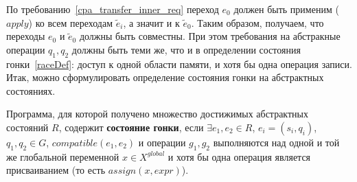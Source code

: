 По требованию~\ref{cpa_transfer_inner_req} переход $e_0$ должен быть применим ($apply$) ко всем переходам $\tilde{e}_i$, а значит и к $\tilde{e}_0$.
Таким образом, получаем, что переходы $e_0$ и $\tilde{e}_0$ должны быть совместны.
При этом требования на абстракные операции $q_1, q_2$ должны быть теми же, что и в определении состояния гонки~\ref{raceDef}: доступ к одной области памяти, и хотя бы одна операция записи.
Итак, можно сформулировать определение состояния гонки на абстрактных состояниях.

\begin{defn}
\label{raceDef_abstract}
Программа, для которой получено множество достижимых абстрактных состояний $R$, содержит \textbf{состояние гонки}, если $\exists e_1, e_2 \in R$, $e_i=(s_i,q_i)$, $q_1, q_2 \in G$, $compatible(e_1, e_2)$ и операции $g_1, g_2$ выполняются над одной и той же глобальной переменной $x \in X^{global}$ и хотя бы одна операция является присваиванием (то есть $assign(x, expr)$).
\end{defn}


